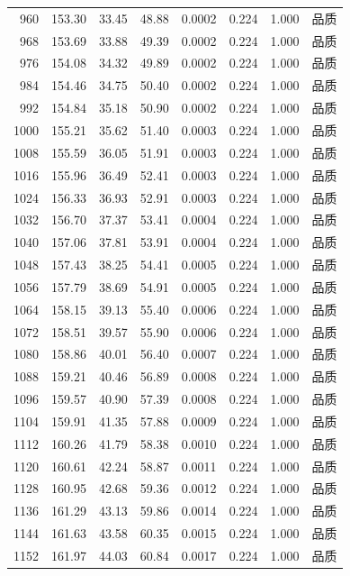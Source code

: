 \begin{longtable}{rrrrrrrr}
960 & 153.30 & 33.45 & 48.88 & 0.0002 & 0.224 & 1.000 & 品质 \\
968 & 153.69 & 33.88 & 49.39 & 0.0002 & 0.224 & 1.000 & 品质 \\
976 & 154.08 & 34.32 & 49.89 & 0.0002 & 0.224 & 1.000 & 品质 \\
984 & 154.46 & 34.75 & 50.40 & 0.0002 & 0.224 & 1.000 & 品质 \\
992 & 154.84 & 35.18 & 50.90 & 0.0002 & 0.224 & 1.000 & 品质 \\
1000 & 155.21 & 35.62 & 51.40 & 0.0003 & 0.224 & 1.000 & 品质 \\
1008 & 155.59 & 36.05 & 51.91 & 0.0003 & 0.224 & 1.000 & 品质 \\
1016 & 155.96 & 36.49 & 52.41 & 0.0003 & 0.224 & 1.000 & 品质 \\
1024 & 156.33 & 36.93 & 52.91 & 0.0003 & 0.224 & 1.000 & 品质 \\
1032 & 156.70 & 37.37 & 53.41 & 0.0004 & 0.224 & 1.000 & 品质 \\
1040 & 157.06 & 37.81 & 53.91 & 0.0004 & 0.224 & 1.000 & 品质 \\
1048 & 157.43 & 38.25 & 54.41 & 0.0005 & 0.224 & 1.000 & 品质 \\
1056 & 157.79 & 38.69 & 54.91 & 0.0005 & 0.224 & 1.000 & 品质 \\
1064 & 158.15 & 39.13 & 55.40 & 0.0006 & 0.224 & 1.000 & 品质 \\
1072 & 158.51 & 39.57 & 55.90 & 0.0006 & 0.224 & 1.000 & 品质 \\
1080 & 158.86 & 40.01 & 56.40 & 0.0007 & 0.224 & 1.000 & 品质 \\
1088 & 159.21 & 40.46 & 56.89 & 0.0008 & 0.224 & 1.000 & 品质 \\
1096 & 159.57 & 40.90 & 57.39 & 0.0008 & 0.224 & 1.000 & 品质 \\
1104 & 159.91 & 41.35 & 57.88 & 0.0009 & 0.224 & 1.000 & 品质 \\
1112 & 160.26 & 41.79 & 58.38 & 0.0010 & 0.224 & 1.000 & 品质 \\
1120 & 160.61 & 42.24 & 58.87 & 0.0011 & 0.224 & 1.000 & 品质 \\
1128 & 160.95 & 42.68 & 59.36 & 0.0012 & 0.224 & 1.000 & 品质 \\
1136 & 161.29 & 43.13 & 59.86 & 0.0014 & 0.224 & 1.000 & 品质 \\
1144 & 161.63 & 43.58 & 60.35 & 0.0015 & 0.224 & 1.000 & 品质 \\
1152 & 161.97 & 44.03 & 60.84 & 0.0017 & 0.224 & 1.000 & 品质 \\

\end{longtable}

